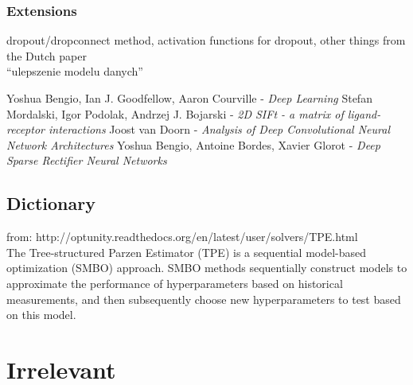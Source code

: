 \documentclass[a4paper,10pt]{report}
\begin{document}
        \subsection{Extensions} %
	dropout/dropconnect method, activation functions for dropout, other things from the Dutch paper\\
	 
	 ``ulepszenie modelu danych''
      

  \begin{thebibliography}{99}
      Yoshua Bengio, Ian J. Goodfellow, Aaron Courville - \emph{Deep Learning}
      Stefan Mordalski, Igor Podolak, Andrzej J. Bojarski - \emph{2D SIFt - a matrix of ligand-receptor interactions}
      Joost van Doorn - \emph{Analysis of Deep Convolutional Neural Network Architectures}
      Yoshua Bengio, Antoine Bordes, Xavier Glorot - \emph{Deep Sparse Rectifier Neural Networks}
    
    
  \end{thebibliography}
  
  \begin{appendices}
    \chapter{Dictionary}
      from: http://optunity.readthedocs.org/en/latest/user/solvers/TPE.html\\
      
      The Tree-structured Parzen Estimator (TPE) is a sequential model-based optimization (SMBO) approach. SMBO methods sequentially construct models to approximate the performance of hyperparameters based on historical measurements, and then subsequently choose new hyperparameters to test based on this model.
  \end{appendices}
    
  \chapter{Irrelevant} %
\end{document}
